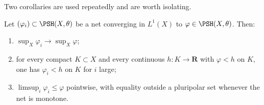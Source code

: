 Two corollaries are used repeatedly and are worth isolating.

\begin{corollary}\label{cor:ch51-hartogs}
Let \((\varphi_i)\subset\PSH(X,\theta)\) be a net converging in
\(L^1(X)\) to \(\varphi\in\PSH(X,\theta)\).  Then:
\begin{enumerate}
\item\label{itm:ch51-hartogs:sup}
      \(\sup_X\varphi_i\to\sup_X\varphi\);
\item\label{itm:ch51-hartogs:hartogs}
      for every compact \(K\subset X\) and every continuous
      \(h:K\to\mathbf R\) with \(\varphi<h\) on \(K\), one has
      \(\varphi_i<h\) on \(K\) for \(i\) large;
\item\label{itm:ch51-hartogs:limsup}
      \(\limsup_i\varphi_i\leq\varphi\) pointwise, with equality outside a
      pluripolar set whenever the net is monotone.
\end{enumerate}
\end{corollary}

